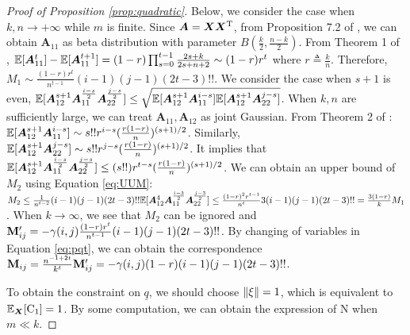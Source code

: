 \documentclass[appliedmath,article,accept,pdftex,moreauthors]{Definitions/mdpi}
\begin{document}
\begin{proof}[Proof of Proposition \ref{prop:quadratic}]
{Below,} we consider the case when $k, n \to +\infty$ while $m$ is finite. Since $\bm{A}=\bm{X}\bm{X}^{\mathrm{T}}$, from Proposition 7.2 of \cite{eaton1989group}, we can obtain $\bm{A}_{11}$ as beta distribution with parameter $B(\frac{k}{2}, \frac{n-k}{2})$.
From Theorem 1 of \cite{multivariateBeta},
$\mathbb{E}[\bm{A}_{11}^t]-\mathbb{E}[\bm{A}_{11}^{t+1}] = (1-r)\prod_{s=0}^{t-1} \frac{2s+k}{2s+n+2} \sim (1-r)r^t$ where
$ r \triangleq \frac{k}{n}$. Therefore, $M_1 \sim \frac{(1-r)r^t}{n^{t-1}}(i-1)(j-1)(2t-3)!!$.
We consider the case when $s+1$ is even, $\mathbb{E}[\bm{A}_{12}^{s+1} \bm{A}_{11}^{\frac{i - s}{2}}\bm{A}_{22}^{\frac{j - s}{2}}] \leq \sqrt{\mathbb{E}[\bm{A}_{12}^{s+1}\bm{A}_{11}^{i-s}]\mathbb{E}[\bm{A}_{12}^{s+1}\bm{A}_{22}^{j-s}]}$. When $k, n$ are sufficiently large, we can treat $\bm{A}_{11}, \bm{A}_{12}$ as joint Gaussian. From Theorem 2 of \cite{multivariateBeta}: $\mathbb{E}[\bm{A}_{12}^{s+1}\bm{A}_{11}^{i-s}] \sim s!! r^{i-s}(\frac{r(1-r)}{n})^{(s+1)/2}$. Similarly, $\mathbb{E}[\bm{A}_{12}^{s+1}\bm{A}_{22}^{j-s}] \sim s!! r^{j-s}(\frac{r(1-r)}{n})^{(s+1)/2}$. It implies that \linebreak $\mathbb{E}[\bm{A}_{12}^{s+1} \bm{A}_{11}^{\frac{i - s}{2}}\bm{A}_{22}^{\frac{j - s}{2}}] \leq (s!!) r^{t-s}(\frac{r(1-r)}{n})^{(s+1)/2}$. We can obtain an upper bound of $M_2$ using Equation \eqref{eq:UUM}: $M_2 \leq \frac{1}{n^{t-2}} (i-1)(j-1)(2t-3)!!\mathbb{E}[\bm{A}_{12}^{4} \bm{A}_{11}^{\frac{i - 3}{2}}\bm{A}_{22}^{\frac{j - 3}{2}}] \leq \frac{(1-r)^2 r^{t-1}}{n^t}3(i-1)(j-1)(2t-3)!!= \frac{3(1-r)}{k} M_1$.
When $k \to \infty$, we see that $M_2$ can be ignored and $\mathbf{M}'_{ij} = -\gamma(i,j)\frac{(1-r)r^t}{n^{t-1}}(i-1)(j-1)(2t-3)!!$. By changing of variables in Equation \eqref{eq:pqt}, we can obtain the correspondence $\mathbf{M}_{ij} = \frac{n^{-1+2t}}{k^t} \mathbf{M}'_{ij} = -\gamma(i,j)(1-r)(i-1)(j-1)(2t-3)!!$. 

To obtain the constraint on $\underline{q}$, we should choose $\lVert\xi\rVert = 1$, which is equivalent to $\mathbb{E}_{\bm{X}}[\mathrm{C}_1] = 1$. By some computation, we can obtain the expression of $\mathrm{N}$ when $ m \ll k$.

\end{proof}
\end{document}
